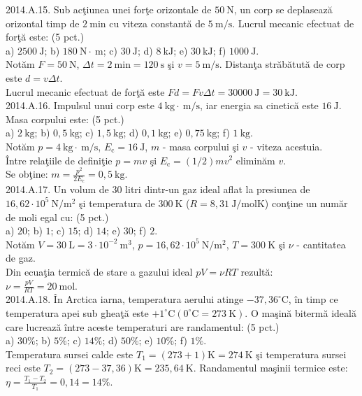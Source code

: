 2014.A.15. Sub acţiunea unei forţe orizontale de $50 \mathrm{~N}$, un corp se deplasează orizontal timp de $2 \mathrm{~min}$ cu viteza constantă de $5 \mathrm{~m} / \mathrm{s}$. Lucrul mecanic efectuat de forţă este: (5 pct.)\\ a) $2500 \mathrm{~J}$; b) $180 \mathrm{~N} \cdot \mathrm{~m}$; c) $30 \mathrm{~J}$; d) $8 \mathrm{~kJ}$; e) $30 \mathrm{~kJ}$; f) $1000 \mathrm{~J}$.\\ Notăm $F=50 \mathrm{~N}$, $\Delta t=2 \mathrm{~min}=120 \mathrm{~s}$ şi $v=5 \mathrm{~m} / \mathrm{s}$. Distanţa străbătută de corp este $d=v \Delta t$.\\ Lucrul mecanic efectuat de forţă este $F d=F v \Delta t=30000 \mathrm{~J}=30 \mathrm{~kJ}$.\\

2014.A.16. Impulsul unui corp este $4 \mathrm{~kg} \cdot \mathrm{~m} / \mathrm{s}$, iar energia sa cinetică este $16 \mathrm{~J}$. Masa corpului este: (5 pct.)\\ a) $2 \mathrm{~kg}$; b) $0,5 \mathrm{~kg}$; c) $1,5 \mathrm{~kg}$; d) $0,1 \mathrm{~kg}$; e) $0,75 \mathrm{~kg}$; f) $1 \mathrm{~kg}$.\\ Notăm $p=4 \mathrm{~kg} \cdot \mathrm{~m} / \mathrm{s}$, $E_{\mathrm{c}}=16 \mathrm{~J}$, $m$ - masa corpului şi $v$ - viteza acestuia.\\ Între relaţiile de definiţie $p=m v$ şi $E_{\mathrm{c}}=(1 / 2) m v^{2}$ eliminăm $v$.\\ Se obţine: $m=\frac{p^{2}}{2 E_{\mathrm{c}}}=0,5 \mathrm{~kg}$.\\

2014.A.17. Un volum de $30$ litri dintr-un gaz ideal aflat la presiunea de $16,62 \cdot 10^{5} \mathrm{~N} / \mathrm{m}^{2}$ şi temperatura de $300 \mathrm{~K}$ ($R=8,31 \mathrm{~J} / \mathrm{mol} \mathrm{K}$) conţine un număr de moli egal cu: (5 pct.)\\ a) $20$; b) $1$; c) $15$; d) $14$; e) $30$; f) $2$.\\ Notăm $V=30 \mathrm{~L}=3 \cdot 10^{-2} \mathrm{~m}^{3}$, $p=16,62 \cdot 10^{5} \mathrm{~N} / \mathrm{m}^{2}$, $T=300 \mathrm{~K}$ şi $\nu$ - cantitatea de gaz.\\ Din ecuaţia termică de stare a gazului ideal $p V=\nu R T$ rezultă:\\ $\nu=\frac{p V}{R T}=20 \mathrm{~mol}$.\\

2014.A.18. În Arctica iarna, temperatura aerului atinge $-37,36^{\circ} \mathrm{C}$, în timp ce temperatura apei sub gheaţă este $+1^{\circ} \mathrm{C}\left(0^{\circ} \mathrm{C}=273 \mathrm{~K}\right)$. O maşină bitermă ideală care lucrează între aceste temperaturi are randamentul: (5 pct.)\\ a) $30 \%$; b) $5 \%$; c) $14 \%$; d) $50 \%$; e) $10 \%$; f) $1 \%$.\\ Temperatura sursei calde este $T_{1}=(273+1) \mathrm{K}=274 \mathrm{~K}$ şi temperatura sursei reci este $T_{2}=(273-37,36) \mathrm{K}=235,64 \mathrm{~K}$. Randamentul maşinii termice este:\\ $\eta=\frac{T_{1}-T_{2}}{T_{1}}=0,14=14 \%$.\\

